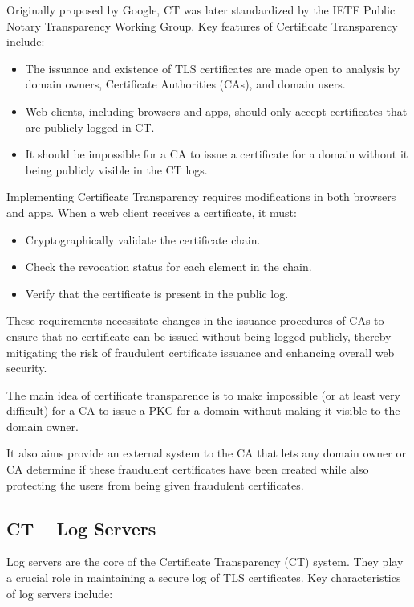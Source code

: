 Originally proposed by Google, CT was later standardized by the IETF
Public Notary Transparency Working Group. Key features of Certificate
Transparency include:

\begin{itemize}
    \item The issuance and existence of TLS certificates are made open
      to analysis by domain owners, Certificate Authorities (CAs), and
      domain users.
    \item Web clients, including browsers and apps, should only accept
      certificates that are publicly logged in CT.
    \item It should be impossible for a CA to issue a certificate for
      a domain without it being publicly visible in the CT logs.
\end{itemize}

Implementing Certificate Transparency requires modifications in both
browsers and apps. When a web client receives a certificate, it must:

\begin{itemize}
    \item Cryptographically validate the certificate chain.
    \item Check the revocation status for each element in the chain.
    \item Verify that the certificate is present in the public log.
\end{itemize}

These requirements necessitate changes in the issuance procedures of
CAs to ensure that no certificate can be issued without being logged
publicly, thereby mitigating the risk of fraudulent certificate
issuance and enhancing overall web security.

\begin{boxH}
  The main idea of certificate transparence is to make impossible (or
  at least very difficult) for a CA to issue a PKC for a domain
  without making it visible to the domain owner.
\end{boxH}
It also aims provide an external system to the CA that lets any domain
owner or CA determine if these fraudulent certificates have been
created while also protecting the users from being given fraudulent 
certificates.

\subsection{CT – Log Servers}
Log servers are the core of the Certificate Transparency (CT) system.
They play a crucial role in maintaining a secure log of TLS
certificates. Key characteristics of log servers include:

